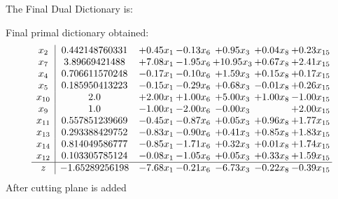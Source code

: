 \documentclass[8pt]{article}
\begin{document}
The Final Dual Dictionary is: 

 Final primal dictionary obtained: 
\[\begin{array}{c| c c@{\hskip 2pt} c@{\hskip 2pt} c@{\hskip 2pt} c@{\hskip 2pt} c@{\hskip 2pt} }
 x_{2}   &  0.442148760331 & +  0.45 x_{1} & -0.13 x_{6} & +  0.95 x_{3} & +  0.04 x_{8} & +  0.23 x_{15}\\
 x_{7}   &  3.89669421488 & +  7.08 x_{1} & -1.95 x_{6} & + 10.95 x_{3} & +  0.67 x_{8} & +  2.41 x_{15}\\
 x_{4}   &  0.706611570248 & -0.17 x_{1} & -0.10 x_{6} & +  1.59 x_{3} & +  0.15 x_{8} & +  0.17 x_{15}\\
 x_{5}   &  0.185950413223 & -0.15 x_{1} & -0.29 x_{6} & +  0.68 x_{3} & -0.01 x_{8} & +  0.26 x_{15}\\
 x_{10}   &  2.0 & +  2.00 x_{1} & +  1.00 x_{6} & +  5.00 x_{3} & +  1.00 x_{8} & -1.00 x_{15}\\
 x_{9}   &  1.0 & -1.00 x_{1} & -2.00 x_{6} & -0.00 x_{3} &   & +  2.00 x_{15}\\
 x_{11}   &  0.557851239669 & -0.45 x_{1} & -0.87 x_{6} & +  0.05 x_{3} & +  0.96 x_{8} & +  1.77 x_{15}\\
 x_{13}   &  0.293388429752 & -0.83 x_{1} & -0.90 x_{6} & +  0.41 x_{3} & +  0.85 x_{8} & +  1.83 x_{15}\\
 x_{14}   &  0.814049586777 & -0.85 x_{1} & -1.71 x_{6} & +  0.32 x_{3} & +  0.01 x_{8} & +  1.74 x_{15}\\
 x_{12}   &  0.103305785124 & -0.08 x_{1} & -1.05 x_{6} & +  0.05 x_{3} & +  0.33 x_{8} & +  1.59 x_{15}\\
\hline
z    &  -1.65289256198 & -7.68 x_{1} & -0.21 x_{6} & -6.73 x_{3} & -0.22 x_{8} & -0.39 x_{15}\\
\end{array}\]
 After cutting plane is added 
\end{document}
